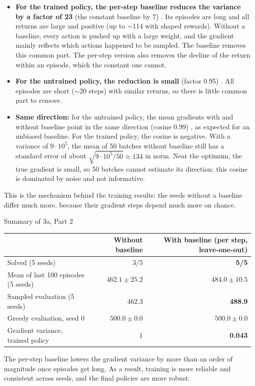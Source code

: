 \begin{itemize}
  \item \textbf{For the trained policy, the per-step baseline reduces the variance by a factor of 23} (the constant baseline by 7) \pass. Its episodes are long and all returns are large and positive (up to $\sim$114 with shaped rewards). Without a baseline, every action is pushed up with a large weight, and the gradient mainly reflects which actions happened to be sampled. The baseline removes this common part. The per-step version also removes the decline of the return within an episode, which the constant one cannot.
  \item \textbf{For the untrained policy, the reduction is small} (factor 0.95) \pass. All episodes are short ($\sim$20 steps) with similar returns, so there is little common part to remove.
  \item \textbf{Same direction:} for the untrained policy, the mean gradients with and without baseline point in the same direction (cosine 0.99) \pass, as expected for an unbiased baseline. For the trained policy, the cosine is negative. With a variance of $9 \cdot 10^5$, the mean of 50 batches without baseline still has a standard error of about $\sqrt{9 \cdot 10^5 / 50} \approx 134$ in norm. Near the optimum, the true gradient is small, so 50 batches cannot estimate its direction: this cosine is dominated by noise and not informative.
\end{itemize}

This is the mechanism behind the training results: the seeds without a baseline differ much more, because their gradient steps depend much more on chance.

\FloatBarrier
\begin{summarybox}{Summary of 3a, Part 2}
\begin{tabularx}{\linewidth}{@{}Lrr@{}}
  \toprule
  & \textbf{Without baseline} & \textbf{With baseline (per step, leave-one-out)} \\
  \midrule
  Solved (5 seeds) & 3/5 & \textbf{5/5} \\
  Mean of last 100 episodes (5 seeds) & $462.1 \pm 25.2$ & $\mathbf{484.0 \pm 10.5}$ \\
  Sampled evaluation (5 seeds) & 462.3 & \textbf{488.9} \\
  Greedy evaluation, seed 0 & $500.0 \pm 0.0$ & $500.0 \pm 0.0$ \\
  Gradient variance, trained policy & 1 & \textbf{0.043} \\
  \bottomrule
\end{tabularx}

\medskip
The per-step baseline lowers the gradient variance by more than an order of magnitude once episodes get long. As a result, training is more reliable and consistent across seeds, and the final policies are more robust.
\end{summarybox}
